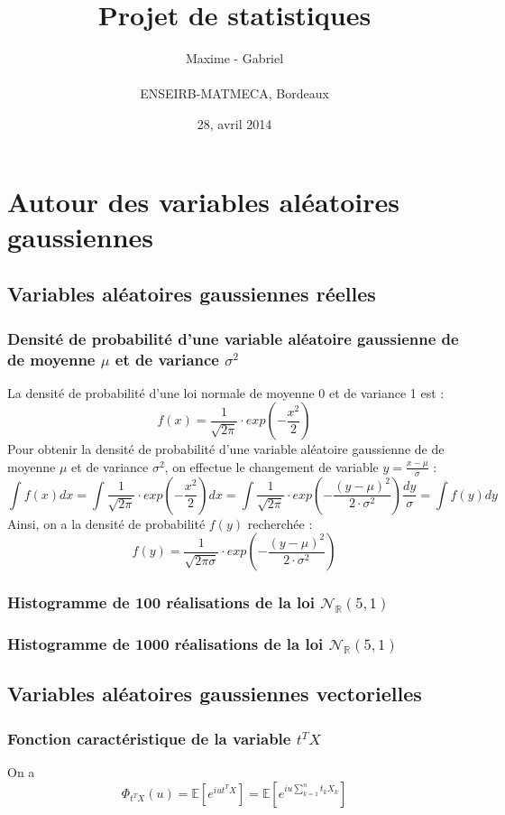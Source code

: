 \documentclass{report}
\title{\textbf{Projet de statistiques}}
\author{{Maxime \bsc{Peterlin} - Gabriel \bsc{Vermeulen} }\\\\{ENSEIRB-MATMECA, Bordeaux}}
\date{28, avril 2014}
\begin{document}
\maketitle

\tableofcontents

\chapter{Autour des variables aléatoires gaussiennes}

	\section{Variables aléatoires gaussiennes réelles}
		\subsection{Densité de probabilité d'une variable aléatoire gaussienne de de moyenne $\mu$ et de variance $\sigma^2$}
			La densité de probabilité d'une loi normale de moyenne 0 et de variance 1 est :
			\[f(x) = \frac{1}{\sqrt{2\pi}} \cdot exp(-\frac{x^2}{2}) \]
			Pour obtenir la densité de probabilité d'une variable aléatoire gaussienne de de moyenne $\mu$ et de variance $\sigma^2$, on effectue le changement de variable $y = \frac{x-\mu}{\sigma}$ :
			\[\int f(x)dx = \int \frac{1}{\sqrt{2\pi}} \cdot exp(-\frac{x^2}{2})dx = \int \frac{1}{\sqrt{2\pi}} \cdot exp(-\frac{(y-\mu)^2}{2\cdot \sigma^2})\frac{dy}{\sigma} = \int f(y)dy \]
			Ainsi, on a la densité de probabilité $f(y)$ recherchée :
			\[f(y) = \frac{1}{\sqrt{2\pi \sigma}} \cdot exp(-\frac{(y-\mu)^2}{2\cdot \sigma^2}) \]
		\subsection{Histogramme de 100 réalisations de la loi $\mathcal{N}_{\mathbb{R}}(5, 1)$}
		\subsection{Histogramme de 1000 réalisations de la loi $\mathcal{N}_{\mathbb{R}}(5, 1)$}

		
	\section{Variables aléatoires gaussiennes vectorielles}
		\subsection{Fonction caractéristique de la variable $t^TX$}
			On a 
			\[\Phi_{t^TX}(u) = \mathbb{E}[e^{iut^TX}] = \mathbb{E}[e^{iu\sum\limits_{k=1}^{n}t_kX_k}] \]
\end{document}
